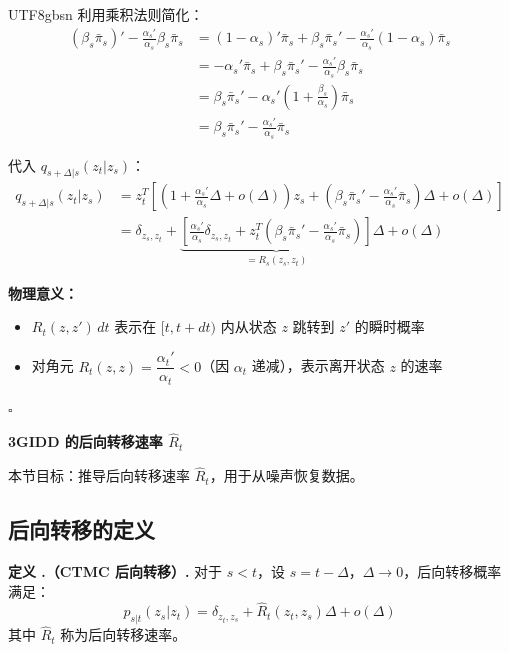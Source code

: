\documentclass[11pt,a4paper]{article}
\newcounter{definition}[section]
\renewcommand{\thedefinition}{\thesection.\arabic{definition}}
\begin{document}
\begin{CJK}{UTF8}{gbsn}
利用乘积法则简化：
\begin{align*}
(\beta_s\bar{\pi}_s)' - \frac{\alpha_s'}{\alpha_s}\beta_s\bar{\pi}_s &= (1-\alpha_s)'\bar{\pi}_s + \beta_s\bar{\pi}_s' - \frac{\alpha_s'}{\alpha_s}(1-\alpha_s)\bar{\pi}_s \\
&= -\alpha_s'\bar{\pi}_s + \beta_s\bar{\pi}_s' - \frac{\alpha_s'}{\alpha_s}\beta_s\bar{\pi}_s \\
&= \beta_s\bar{\pi}_s' - \alpha_s'\left(1 + \frac{\beta_s}{\alpha_s}\right)\bar{\pi}_s \\
&= \beta_s\bar{\pi}_s' - \frac{\alpha_s'}{\alpha_s}\bar{\pi}_s
\end{align*}

代入 $q_{s+\Delta|s}(z_t|z_s)$：
\begin{align*}
q_{s+\Delta|s}(z_t|z_s) &= z_t^T\left[\left(1 + \frac{\alpha_s'}{\alpha_s}\Delta + o(\Delta)\right)z_s + \left(\beta_s\bar{\pi}_s' - \frac{\alpha_s'}{\alpha_s}\bar{\pi}_s\right)\Delta + o(\Delta)\right] \\
&= \delta_{z_s,z_t} + \underbrace{\left[\frac{\alpha_s'}{\alpha_s}\delta_{z_s,z_t} + z_t^T\left(\beta_s\bar{\pi}_s' - \frac{\alpha_s'}{\alpha_s}\bar{\pi}_s\right)\right]}_{= R_s(z_s,z_t)}\Delta + o(\Delta)
\end{align*}


\textbf{物理意义：}
\begin{itemize}[leftmargin=2em]
\item $R_t(z, z') \, dt$ 表示在 $[t, t+dt)$ 内从状态 $z$ 跳转到 $z'$ 的瞬时概率
\item 对角元 $R_t(z, z) = \dfrac{\alpha_t'}{\alpha_t} < 0$（因 $\alpha_t$ 递减），表示离开状态 $z$ 的速率
\end{itemize}
\hfill $\square$

\begin{center}
{\LARGE\bfseries 3\quad GIDD 的后向转移速率 $\hat{R}_t$}
\end{center}

\setcounter{section}{3}
\setcounter{subsection}{0}
\setcounter{definition}{0}

本节目标：推导后向转移速率 $\hat{R}_t$，用于从噪声恢复数据。

\subsection{后向转移的定义}

\begin{defbox}
\textbf{定义 \thedefinition（CTMC 后向转移）.} 对于 $s < t$，设 $s = t - \Delta$，$\Delta \to 0$，后向转移概率满足：
\[
p_{s|t}(z_s|z_t) = \delta_{z_t,z_s} + \hat{R}_t(z_t, z_s)\Delta + o(\Delta)
\]
其中 $\hat{R}_t$ 称为后向转移速率。
\end{defbox}


\end{CJK}
\end{document}
